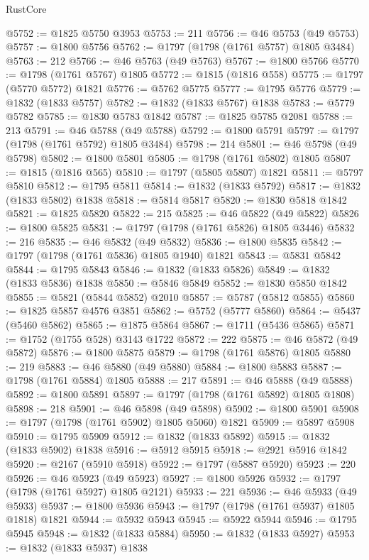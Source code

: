 \begin{lexlean}{RustCore}
\begin{coremodule}
@5752 := @1825 @5750 @3953
@5753 := 211
@5756 := @46 @5753 (@49 @5753)
@5757 := @1800 @5756
@5762 := @1797 (@1798 (@1761 @5757) @1805 @3484)
@5763 := 212
@5766 := @46 @5763 (@49 @5763)
@5767 := @1800 @5766
@5770 := @1798 (@1761 @5767) @1805
@5772 := @1815 (@1816 @558)
@5775 := @1797 (@5770 @5772) @1821
@5776 := @5762 @5775
@5777 := @1795 @5776
@5779 := @1832 (@1833 @5757)
@5782 := @1832 (@1833 @5767) @1838
@5783 := @5779 @5782
@5785 := @1830 @5783 @1842
@5787 := @1825 @5785 @2081
@5788 := 213
@5791 := @46 @5788 (@49 @5788)
@5792 := @1800 @5791
@5797 := @1797 (@1798 (@1761 @5792) @1805 @3484)
@5798 := 214
@5801 := @46 @5798 (@49 @5798)
@5802 := @1800 @5801
@5805 := @1798 (@1761 @5802) @1805
@5807 := @1815 (@1816 @565)
@5810 := @1797 (@5805 @5807) @1821
@5811 := @5797 @5810
@5812 := @1795 @5811
@5814 := @1832 (@1833 @5792)
@5817 := @1832 (@1833 @5802) @1838
@5818 := @5814 @5817
@5820 := @1830 @5818 @1842
@5821 := @1825 @5820
@5822 := 215
@5825 := @46 @5822 (@49 @5822)
@5826 := @1800 @5825
@5831 := @1797 (@1798 (@1761 @5826) @1805 @3446)
@5832 := 216
@5835 := @46 @5832 (@49 @5832)
@5836 := @1800 @5835
@5842 := @1797 (@1798 (@1761 @5836) @1805 @1940) @1821
@5843 := @5831 @5842
@5844 := @1795 @5843
@5846 := @1832 (@1833 @5826)
@5849 := @1832 (@1833 @5836) @1838
@5850 := @5846 @5849
@5852 := @1830 @5850 @1842
@5855 := @5821 (@5844 @5852) @2010
@5857 := @5787 (@5812 @5855)
@5860 := @1825 @5857 @4576 @3851
@5862 := @5752 (@5777 @5860)
@5864 := @5437 (@5460 @5862)
@5865 := @1875 @5864
@5867 := @1711 (@5436 @5865)
@5871 := @1752 (@1755 @528) @3143 @1722
@5872 := 222
@5875 := @46 @5872 (@49 @5872)
@5876 := @1800 @5875
@5879 := @1798 (@1761 @5876) @1805
@5880 := 219
@5883 := @46 @5880 (@49 @5880)
@5884 := @1800 @5883
@5887 := @1798 (@1761 @5884) @1805
@5888 := 217
@5891 := @46 @5888 (@49 @5888)
@5892 := @1800 @5891
@5897 := @1797 (@1798 (@1761 @5892) @1805 @1808)
@5898 := 218
@5901 := @46 @5898 (@49 @5898)
@5902 := @1800 @5901
@5908 := @1797 (@1798 (@1761 @5902) @1805 @5060) @1821
@5909 := @5897 @5908
@5910 := @1795 @5909
@5912 := @1832 (@1833 @5892)
@5915 := @1832 (@1833 @5902) @1838
@5916 := @5912 @5915
@5918 := @2921 @5916 @1842
@5920 := @2167 (@5910 @5918)
@5922 := @1797 (@5887 @5920)
@5923 := 220
@5926 := @46 @5923 (@49 @5923)
@5927 := @1800 @5926
@5932 := @1797 (@1798 (@1761 @5927) @1805 @2121)
@5933 := 221
@5936 := @46 @5933 (@49 @5933)
@5937 := @1800 @5936
@5943 := @1797 (@1798 (@1761 @5937) @1805 @1818) @1821
@5944 := @5932 @5943
@5945 := @5922 @5944
@5946 := @1795 @5945
@5948 := @1832 (@1833 @5884)
@5950 := @1832 (@1833 @5927)
@5953 := @1832 (@1833 @5937) @1838

\end{coremodule}
\end{lexlean}

